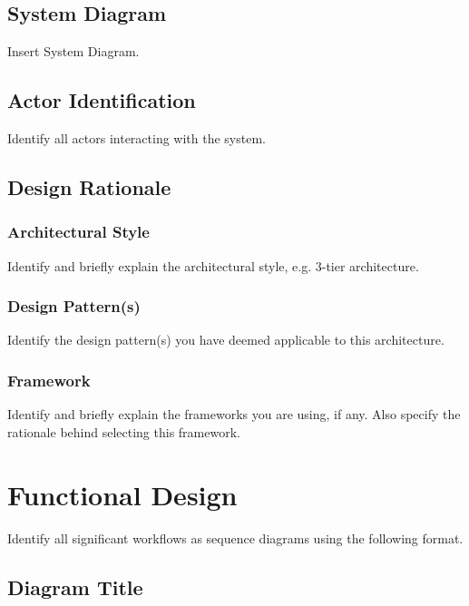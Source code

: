 \documentclass{article}
\begin{document}
\subsection{System Diagram}

Insert System Diagram.

\subsection{Actor Identification}

Identify all actors interacting with the system.

\subsection{Design Rationale}

\subsubsection{Architectural Style}

Identify and briefly explain the architectural style, e.g. 3-tier architecture. 

\subsubsection{Design Pattern(s)}

Identify the design pattern(s) you have deemed applicable to this architecture.

\subsubsection{Framework}

Identify and briefly explain the frameworks you are using, if any. Also 
specify the rationale behind selecting this framework. 

\clearpage

\section{Functional Design}

Identify all significant workflows as sequence diagrams using the following format. 

\subsection{Diagram Title}
\end{document}
